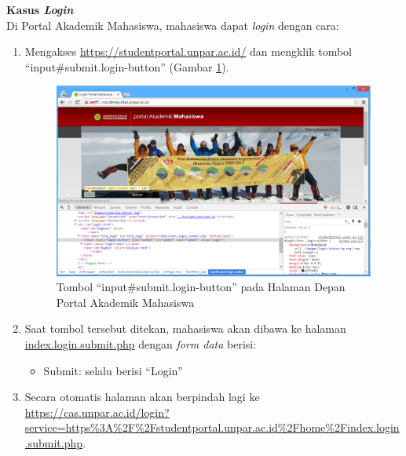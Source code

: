 \documentclass[a4paper,twoside]{article}
\begin{document}
\begin{enumerate}
\begin{enumerate}
\textbf{Kasus \textit{Login}}\\
Di Portal Akademik Mahasiswa, mahasiswa dapat \textit{login} dengan cara:
\begin{enumerate}
	\item Mengakses \url{https://studentportal.unpar.ac.id/} dan mengklik tombol ``input\#submit.login-button'' (Gambar \ref{fig:3_case_login}).
	\begin{figure}[H]
			\centering
			\includegraphics[scale=0.5]{Gambar/case-login}
			\caption{Tombol ``input\#submit.login-button'' pada Halaman Depan Portal Akademik Mahasiswa} 
			\label{fig:3_case_login}
		\end{figure}
		
	\item Saat tombol tersebut ditekan, mahasiswa akan dibawa ke halaman \url{index.login.submit.php} dengan \textit{form data} berisi:
			\begin{itemize}
				\item Submit: selalu berisi ``Login''
			\end{itemize}
		
	\item Secara otomatis halaman akan berpindah lagi ke \url{https://cas.unpar.ac.id/login? service=https\%3A\%2F\%2Fstudentportal.unpar.ac.id\%2Fhome\%2Findex.login.submit.php}.
		

\end{enumerate}
\end{enumerate}
\end{enumerate}
\end{document}
